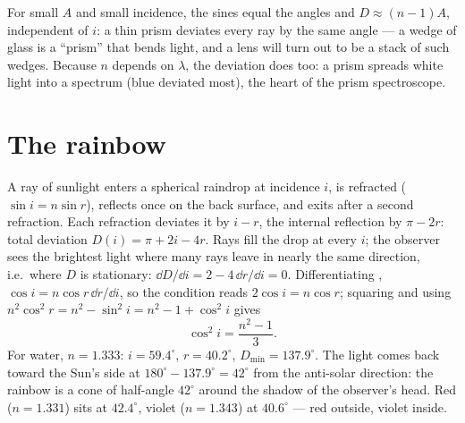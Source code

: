\begin{remark}\label{rem:b1:rays-reflection-refraction:thin}
For small $A$ and small incidence, the sines equal the angles and
$D \approx (n - 1)A$, independent of $i$: a thin prism deviates every
ray by the same angle --- a wedge of glass is a ``prism'' that bends
light, and a lens will turn out to be a stack of such wedges. Because
$n$ depends on $\lambda$, the deviation does too: a prism spreads white
light into a spectrum (blue deviated most), the heart of the prism
spectroscope.
\end{remark}

\section{The rainbow}

\begin{example}\label{ex:b1:rays-reflection-refraction:rainbow}
A ray of sunlight enters a spherical raindrop at incidence $i$, is
refracted ($\sin i = n\sin r$), reflects once on the back surface, and
exits after a second refraction. Each refraction deviates it by
$i - r$, the internal reflection by $\pi - 2r$: total deviation
$D(i) = \pi + 2i - 4r$. Rays fill the drop at every $i$; the observer
sees the brightest light where many rays leave in nearly the same
direction, i.e.\ where $D$ is stationary: $\dd D/\dd i = 2 - 4\,\dd r/\dd i
= 0$. Differentiating , $\cos i = n\cos r\,\dd r/\dd i$, so
the condition reads $2\cos i = n\cos r$; squaring and using
$n^2\cos^2 r = n^2 - \sin^2 i = n^2 - 1 + \cos^2 i$ gives
\[
\cos^2 i = \frac{n^2 - 1}{3} .
\]
For water, $n = 1.333$: $i = 59.4^\circ$, $r = 40.2^\circ$,
$D_{\min} = 137.9^\circ$. The light comes back toward the Sun's side
at $180^\circ - 137.9^\circ = 42^\circ$ from the anti-solar direction:
the rainbow is a cone of half-angle $42^\circ$ around the shadow of the
observer's head. Red ($n = 1.331$) sits at $42.4^\circ$, violet
($n = 1.343$) at $40.6^\circ$ --- red outside, violet inside.
\end{example}

